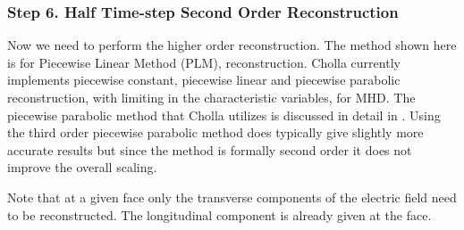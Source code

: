 \subsubsection{Step 6. Half Time-step Second Order Reconstruction}
\label{vlct:higher-order-reconstruction}

Now we need to perform the higher order reconstruction. The method shown here is for Piecewise Linear Method (PLM), reconstruction. Cholla currently implements piecewise constant, piecewise linear and piecewise parabolic reconstruction, with limiting in the characteristic variables, for MHD. The piecewise parabolic method that Cholla utilizes is discussed in detail in \cite{felker_2020}. Using the third order piecewise parabolic method does typically give slightly more accurate results but since the method is formally second order it does not improve the overall scaling.

Note that at a given face only the transverse components of the electric field need to be reconstructed. The longitudinal component is already given at the face.

